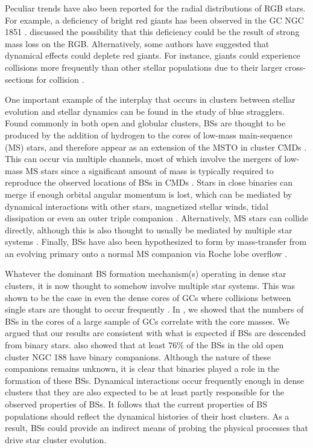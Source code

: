 Peculiar trends have also been reported for the radial distributions
of RGB stars.  
For example, a deficiency of bright red giants has been observed 
in the GC NGC 1851 \citep[e.g.][]{iannicola09}.  \citet{sandquist07} 
discussed the possibility that this deficiency could be the result of
strong mass loss on the RGB.  
Alternatively, some authors have suggested that dynamical effects could
deplete red giants.  For instance, 
giants could experience collisions more frequently than other stellar
populations due to their larger cross-sections for collision
\citep{beers04}.

One important example of the interplay that occurs in clusters between
stellar evolution and stellar dynamics can be found in the study
of blue stragglers.  Found commonly in both open and globular clusters, BSs are
thought to be produced by the addition of hydrogen to the cores of
low-mass main-sequence (MS) stars, and therefore appear as an
extension of the MSTO in cluster CMDs \citep{sandage53}.  This can
occur via multiple channels, most of which involve the mergers of
low-mass MS stars since a significant amount of mass is typically 
required to reproduce the observed locations of BSs in CMDs
\citep[e.g.][]{sills99}.  Stars in close binaries can merge if enough
orbital angular momentum is lost, which can be mediated by dynamical
interactions with other stars, magnetized stellar winds, tidal
dissipation or even an outer triple companion
\citep[e.g.][]{leonard92, li06, perets09, dervisoglu10}.
Alternatively, MS stars can collide directly, although this is 
also thought to usually be mediated by multiple star systems
\citep[e.g.][]{leonard89, fregeau04, leigh10}.  Finally, BSs have also
been hypothesized to form by 
mass-transfer from an evolving primary onto a normal MS companion
via Roche lobe overflow \citep{mccrea64}.  

Whatever the dominant BS
formation mechanism(s) operating in dense star clusters, it is now
thought to somehow involve multiple star systems.  This was shown 
to be the case in even the dense cores of GCs \citep{knigge09} where
collisions between single stars are thought to occur frequently
\citep{leonard89}.  In \citet{knigge09}, we showed that the numbers of
BSs in the cores 
of a large sample of GCs correlate with the core masses.  We 
argued that our results are consistent with what is expected if BSs
are descended from binary stars.  \citet{mathieu09} also showed
that at least $76\%$ of the BSs in the old open cluster NGC 188 have 
binary companions.  Although the nature of these companions remains
unknown, it is clear that binaries played a role in the
formation of these BSs.  Dynamical
interactions occur frequently enough in dense clusters that they
are also expected to be at least partly responsible for the observed
properties of BSs.  It follows
that the current properties of BS populations
should reflect the dynamical histories of their host clusters.  As a
result, BSs could provide an indirect means of probing
the physical processes that drive star cluster evolution.

